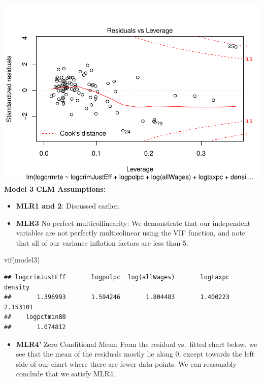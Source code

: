 \documentclass[]{article}
\newenvironment{Shaded}{}{}
\newcommand{\KeywordTok}[1]{\textcolor[rgb]{0.00,0.00,1.00}{#1}}
\newcommand{\NormalTok}[1]{#1}
\providecommand{\tightlist}{%
  \setlength{\itemsep}{0pt}\setlength{\parskip}{0pt}}
\begin{document}
\includegraphics{Bagnard_Gaustad_Hartman_Leung_Lab_3_files/figure-latex/unnamed-chunk-100-4.pdf}
\textbf{Model 3 CLM Assumptions:}

\begin{itemize}
\item
  \textbf{MLR1 and 2}: Discussed earlier.
\item
  \textbf{MLR3} No perfect multicollinearity: We demonstrate that our
  independent variables are not perfectly multicolinear using the VIF
  function, and note that all of our variance inflation factors are less
  than 5.
\end{itemize}

\begin{Shaded}
\begin{Highlighting}[]
\KeywordTok{vif}\NormalTok{(model3)}
\end{Highlighting}
\end{Shaded}

\begin{verbatim}
## logcrimJustEff       logpolpc  log(allWages)       logtaxpc        density 
##       1.396993       1.594246       1.804483       1.400223       2.153101 
##    logpctmin80 
##       1.074812
\end{verbatim}

\begin{itemize}
\tightlist
\item
  \textbf{MLR4'} Zero Conditional Mean: From the residual vs.~fitted
  chart below, we see that the mean of the residuals mostly lie along 0,
  except towards the left side of our chart where there are fewer data
  points. We can reasonably conclude that we satisfy MLR4.
\end{itemize}
\end{document}
